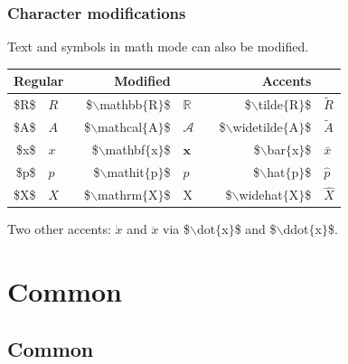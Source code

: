 \begin{frame} \frametitle{Character modifications}
	Text and symbols in math mode can also be modified.
	\begin{center}
		\begin{tabular}{rl p{4mm} rl p{4mm} rl}
			\hline
			\multicolumn{3}{l}{Regular} & {Modified} &&& {Accents} & \\
			\hline
			{\color{braces}\${\color{black}R}\$} & $R$ &&
			{\color{braces}\${\color{command}$\backslash$mathbb}$\{${\color{black}R}$\}$\$} & $\mathbb{R}$ &&
			{\color{braces}\${\color{command}$\backslash$tilde}$\{${\color{black}R}$\}$\$} & $\tilde{R}$ \\
			{\color{braces}\${\color{black}A}\$} & $A$ &&
			{\color{braces}\${\color{command}$\backslash$mathcal}$\{${\color{black}A}$\}$\$} & $\mathcal{A}$ &&
			{\color{braces}\${\color{command}$\backslash$widetilde}$\{${\color{black}A}$\}$\$} & $\widetilde{A}$ \\
			{\color{braces}\${\color{black}x}\$} & $x$ &&
			{\color{braces}\${\color{command}$\backslash$mathbf}$\{${\color{black}x}$\}$\$} & $\mathbf{x}$ &&
			{\color{braces}\${\color{command}$\backslash$bar}$\{${\color{black}x}$\}$\$} & $\bar{x}$ \\
			{\color{braces}\${\color{black}p}\$} & $p$ &&
			{\color{braces}\${\color{command}$\backslash$mathit}$\{${\color{black}p}$\}$\$} & $\mathit{p}$ &&
			{\color{braces}\${\color{command}$\backslash$hat}$\{${\color{black}p}$\}$\$} & $\hat{p}$ \\
			{\color{braces}\${\color{black}X}\$} & $X$ &&
			{\color{braces}\${\color{command}$\backslash$mathrm}$\{${\color{black}X}$\}$\$} & $\mathrm{X}$ &&
			{\color{braces}\${\color{command}$\backslash$widehat}$\{${\color{black}X}$\}$\$} & $\widehat{X}$ \\
			\hline
		\end{tabular}
	\end{center}
	Two other accents: $\dot{x}$ and $\ddot{x}$ via {\color{braces}\${\color{command}$\backslash$dot}$\{${\color{black}x}$\}$\$} and {\color{braces}\${\color{command}$\backslash$ddot}$\{${\color{black}x}$\}$\$}.
\end{frame}

\section{Common}
\subsection{Common}
	
